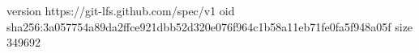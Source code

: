 version https://git-lfs.github.com/spec/v1
oid sha256:3a057754a89da2ffce921dbb52d320e076f964c1b58a11eb71fe0fa5f948a05f
size 349692
